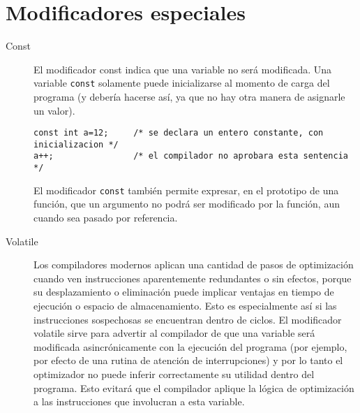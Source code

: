 \section{Modificadores especiales}

\begin{description}
	\item[Const] 
	El modificador const indica que una variable no será modificada. Una variable \texttt{const} solamente puede inicializarse al
momento de carga del programa (y debería hacerse así, ya que no hay otra manera de asignarle un
valor).
\begin{lstlisting}
const int a=12; 	/* se declara un entero constante, con inicializacion */
a++;				/* el compilador no aprobara esta sentencia */
\end{lstlisting}
El modificador \texttt{const} también permite expresar, en el prototipo de una función, que un argumento no
podrá ser modificado por la función, aun cuando sea pasado por referencia.
\item [Volatile]
Los compiladores modernos aplican una cantidad de pasos de optimización cuando ven instrucciones
aparentemente redundantes o sin efectos, porque su desplazamiento o eliminación puede implicar
ventajas en tiempo de ejecución o espacio de almacenamiento. Esto es especialmente así si las
instrucciones sospechosas se encuentran dentro de ciclos. El modificador volatile sirve para advertir al
compilador de que una variable será modificada asincrónicamente con la ejecución del programa (por
ejemplo, por efecto de una rutina de atención de interrupciones) y por lo tanto el optimizador no puede
inferir correctamente su utilidad dentro del programa. Esto evitará que el compilador aplique la lógica
de optimización a las instrucciones que involucran a esta variable.
\end{description}

